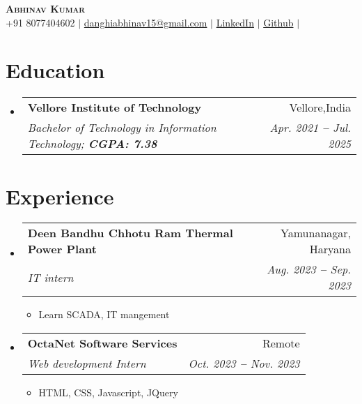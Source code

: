 \documentclass[letterpaper,11pt]{article}
\makeatletter
\newcommand{\resumeItem}[1]{
  \item\small{
    {#1 \vspace{-2pt}}
  }
}
\newcommand{\resumeSubheading}[4]{
  \vspace{-2pt}\item
    \begin{tabular*}{0.97\textwidth}[t]{l@{\extracolsep{\fill}}r}
      \textbf{#1} & #2 \\
      \textit{\small#3} & \textit{\small #4} \\
    \end{tabular*}\vspace{-7pt}
}
\newcommand{\resumeSubHeadingListStart}{\begin{itemize}[leftmargin=0.15in, label={}]}
\newcommand{\resumeSubHeadingListEnd}{\end{itemize}}
\newcommand{\resumeItemListStart}{\begin{itemize}}
\newcommand{\resumeItemListEnd}{\end{itemize}\vspace{-5pt}}
\makeatother
\begin{document}

\begin{center}
    \textbf{\Huge \scshape Abhinav Kumar} \\ \vspace{3pt}
    \small
    \faMobile \hspace{.5pt} {+91 8077404602}
    $|$
    \faAt \hspace{.5pt} \href{mailto:danghiabhinav15@gmail.com}{danghiabhinav15@gmail.com}
    $|$
    \faLinkedinSquare \hspace{.5pt} \href{https://www.linkedin.com/in/abhinav-k-64304618b/}{LinkedIn}
    $|$
    \faGithub \hspace{.5pt} \href{https://github.com/123danghi}{Github}
    $|$
    
\end{center}




\section{Education}
  \vspace{3pt}
  \resumeSubHeadingListStart

  
\resumeSubheading
{Vellore Institute of Technology
}{Vellore,India}
{Bachelor of Technology in Information Technology;   \textbf{CGPA: 7.38}}{Apr. 2021 \textbf{--} Jul. 2025}


  \resumeSubHeadingListEnd



\section{Experience}
  \vspace{3pt}
  \resumeSubHeadingListStart

  
\resumeSubheading
      {Deen Bandhu Chhotu Ram Thermal Power Plant}{Yamunanagar, Haryana}
      {IT intern}{Aug. 2023 \textbf{--} Sep. 2023}
      \resumeItemListStart
      \resumeItem{Learn SCADA, IT mangement}
        \resumeItemListEnd

\resumeSubheading
      {OctaNet Software Services}{Remote}
      {Web development Intern}{Oct. 2023 \textbf{--} Nov. 2023}
      \resumeItemListStart
      \resumeItem{HTML, CSS, Javascript, JQuery}
        \resumeItemListEnd


  \resumeSubHeadingListEnd
\end{document}
